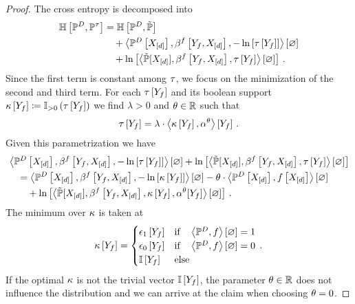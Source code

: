 \begin{proof}
    The cross entropy is decomposed into
    \begin{align*}
        \mathbb{H}\left[\mathbb{P}^{D},\mathbb{P}^{\tau}\right]
        &= \mathbb{H}\left[\mathbb{P}^{D},\tilde{\mathbb{P}}\right] \\
        &\quad + \left\langle \mathbb{P}^{D}\left[X_{[d]}\right],\beta^{f}\left[Y_{f},X_{[d]}\right],-\ln \left[ \tau\left[Y_{f}\right] \right]\right\rangle \left[ \varnothing \right] \\
        &\quad + \ln \left[ \left\langle \tilde{\mathbb{P}}[X_{[d]}],\beta^{f}\left[Y_{f},X_{[d]}\right],\tau\left[Y_{f}\right]\right\rangle \left[ \varnothing \right] \right]\, .
    \end{align*}
    Since the first term is constant among $\tau$, we focus on the minimization of the second and third term.
    For each $\tau\left[Y_{f}\right]$ and its boolean support $\kappa\left[Y_{f}\right]\coloneqq\mathbb{I}_{>0}\left(\tau\left[Y_{f}\right]\right)$ we find $\lambda>0$ and $\theta\in\mathbb{R}$ such that
    \begin{align*}
        \tau\left[Y_{f}\right]
        = \lambda\cdot\left\langle \kappa\left[Y_{f}\right],\alpha^{\theta}\right\rangle \left[ Y_{f} \right] \, .
    \end{align*}
    Given this parametrization we have
    \begin{align*}
        & \left\langle \mathbb{P}^{D}\left[X_{[d]}\right],\beta^{f}\left[Y_{f},X_{[d]}\right],-\ln \left[ \tau\left[Y_{f}\right] \right]\right\rangle \left[ \varnothing \right]
        + \ln \left[ \left\langle \tilde{\mathbb{P}}[X_{[d]}],\beta^{f}\left[Y_{f},X_{[d]}\right],\tau\left[Y_{f}\right]\right\rangle \left[ \varnothing \right] \right] \\
        & \quad  = \left\langle \mathbb{P}^{D}\left[X_{[d]}\right],\beta^{f}\left[Y_{f},X_{[d]}\right],-\ln \left[ \kappa\left[Y_{f}\right] \right]\right\rangle \left[ \varnothing \right] - \theta\cdot\left\langle \mathbb{P}^{D}\left[X_{[d]}\right],f\left[X_{[d]}\right]\right\rangle \left[ \varnothing \right] \\
        & \quad \quad  + \ln \left[ \left\langle \tilde{\mathbb{P}}[X_{[d]}],\beta^{f}\left[Y_{f},X_{[d]}\right],\kappa\left[Y_{f}\right],\alpha^{\theta}[Y_{f}]\right\rangle \left[ \varnothing \right] \right] \, .
    \end{align*}
    The minimum over $\kappa$ is taken at
    \begin{align*}
        \kappa\left[Y_{f}\right] =
        \begin{cases}
            \epsilon_1\left[Y_{f}\right] & \text{if}\quad \left\langle \mathbb{P}^{D},f\right\rangle \left[ \varnothing \right]=1 \\
            \epsilon_0\left[Y_{f}\right] & \text{if}\quad \left\langle \mathbb{P}^{D},f\right\rangle \left[ \varnothing \right]=0 \\
            \mathbb{I}\left[Y_{f}\right] & \text{else}
        \end{cases} \, .
    \end{align*}
    If the optimal $\kappa$ is not the trivial vector $\mathbb{I}\left[Y_{f}\right]$, the parameter $\theta\in\mathbb{R}$ does not influence the distribution and we can arrive at the claim when choosing $\theta=0$.

\end{proof}
